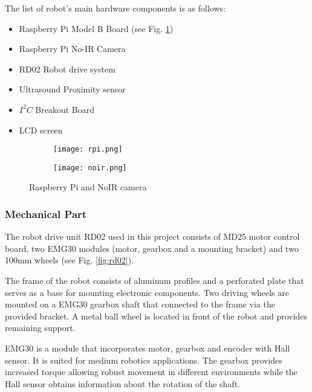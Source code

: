 The list of robot's main hardware components is as follows:

\begin{itemize}
  \item Raspberry Pi Model B Board (see Fig. \ref{fig:rpi_board})
  \item Raspberry Pi No-IR Camera
  \item RD02 Robot drive system
  \item Ultrasound Proximity sensor
  \item $I^2C$ Breakout Board
  \item LCD screen
\end{itemize}

\begin{figure}[h!]
\centering 

	\begin{subfigure}[h]{0.35\textwidth}
		\centering
			\texttt{[image: rpi.png]}
			\label{fig:rpi_board}
	\end{subfigure}
	\begin{subfigure}[h]{0.35\textwidth}
		\centering
			\texttt{[image: noir.png]}
			\label{fig:rpi_noir}
	\end{subfigure}

\caption{Raspberry Pi and NoIR camera}
\label{fig:rpi}
\end{figure}

\subsubsection{Mechanical Part} 

The robot drive unit RD02 used in this project consists of MD25 motor control
board, two EMG30 modules (motor, gearbox and a mounting bracket) and two 100mm
wheels\cite{robotel} (see Fig. \ref{fig:rd02}).

The frame of the robot consists of aluminum profiles and a perforated plate that
serves as a base for mounting electronic components. Two driving wheels
are mounted on a EMG30 gearbox shaft that connected to the frame via the
provided bracket. A metal ball wheel is located in front of the robot and
provides remaining support.

EMG30 is a module that incorporates motor, gearbox and encoder with Hall sensor.
It is suited for medium robotics applications. The gearbox provides increased
torque allowing robust movement in different environments while the Hall sensor
obtains information about the rotation of the shaft.

